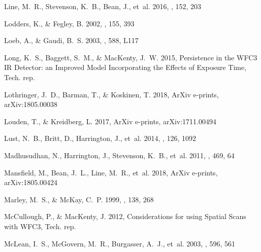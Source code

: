 \documentclass[twocolumn, trackchanges]{aastex61}
\begin{document}
\begin{thebibliography}{}
{Line}, M.~R., {Stevenson}, K.~B., {Bean}, J., {et~al.} 2016, \aj, 152, 203

{Lodders}, K., \& {Fegley}, B. 2002, \icarus, 155, 393

{Loeb}, A., \& {Gaudi}, B.~S. 2003, \apjl, 588, L117

{Long}, K.~S., {Baggett}, S.~M., \& {MacKenty}, J.~W. 2015, {Persistence in the
  WFC3 IR Detector: an Improved Model Incorporating the Effects of Exposure
  Time}, Tech. rep.

{Lothringer}, J.~D., {Barman}, T., \& {Koskinen}, T. 2018, ArXiv e-prints,
  arXiv:1805.00038

{Louden}, T., \& {Kreidberg}, L. 2017, ArXiv e-prints, arXiv:1711.00494

{Lust}, N.~B., {Britt}, D., {Harrington}, J., {et~al.} 2014, \pasp, 126, 1092

{Madhusudhan}, N., {Harrington}, J., {Stevenson}, K.~B., {et~al.} 2011, \nat,
  469, 64

{Mansfield}, M., {Bean}, J.~L., {Line}, M.~R., {et~al.} 2018, ArXiv e-prints,
  arXiv:1805.00424

{Marley}, M.~S., \& {McKay}, C.~P. 1999, \icarus, 138, 268

{McCullough}, P., \& {MacKenty}, J. 2012, {Considerations for using Spatial
  Scans with WFC3}, Tech. rep.

{McLean}, I.~S., {McGovern}, M.~R., {Burgasser}, A.~J., {et~al.} 2003, \apj,
  596, 561


\end{thebibliography}
\end{document}
